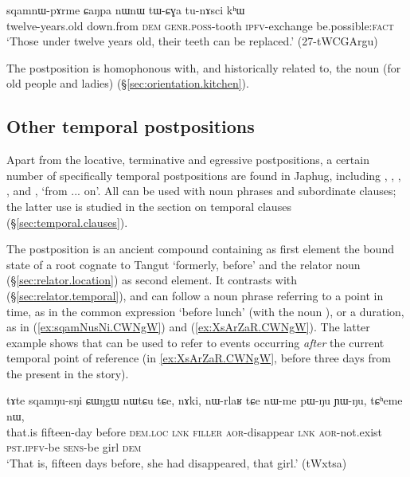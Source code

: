  \begin{exe}
\ex \label{ex:sqamnW.pArme.CaNpa}
 \gll sqamnɯ-pɤrme ɕaŋpa nɯnɯ tɯ-ɕɣa tu-nɤsci kʰɯ \\
 twelve-years.old down.from \textsc{dem} \textsc{genr}.\textsc{poss}-tooth \textsc{ipfv}-exchange be.possible:\textsc{fact} \\
 \glt `Those under twelve years old, their teeth can be replaced.' (27-tWCGArgu) 
\end{exe}

The postposition  is homophonous with, and historically related to, the noun  (for old people and ladies) (§\ref{sec:orientation.kitchen}).

\subsection{Other temporal postpositions} \label{sec:temporal.postpositions}
Apart from the locative, terminative and egressive postpositions, a certain number of specifically temporal postpositions are found in Japhug, including ,  , , ,  and , `from ... on'. All can be used with noun phrases and subordinate clauses; the latter use is studied in the section on temporal clauses (§\ref{sec:temporal.clauses}).

The postposition   is an ancient compound containing as first element the bound state of a root cognate to Tangut  `formerly, before' and the relator noun  (§\ref{sec:relator.location}) as second element. It contrasts with   (§\ref{sec:relator.temporal}), and can follow a noun phrase referring to a point in time, as in the common expression  `before lunch' (with the noun  ), or a duration, as in (\ref{ex:sqamNusNi.CWNgW}) and (\ref{ex:XsArZaR.CWNgW}). The latter example shows that  can be used to refer to events occurring \textit{after} the current temporal point of reference (in \ref{ex:XsArZaR.CWNgW}, before three days from the present in the story).

\begin{exe}
\ex \label{ex:sqamNusNi.CWNgW}
 \gll tɤte sqamŋu-sŋi ɕɯŋgɯ nɯtɕu tɕe, nɤki, nɯ-rlaʁ tɕe nɯ-me pɯ-ŋu ɲɯ-ŋu, tɕʰeme nɯ, \\
 that.is fifteen-day before \textsc{dem}.\textsc{loc} \textsc{lnk} \textsc{filler} \textsc{aor}-disappear \textsc{lnk} \textsc{aor}-not.exist \textsc{pst}.\textsc{ipfv}-be \textsc{sens}-be girl \textsc{dem} \\
 \glt `That is, fifteen days before, she had disappeared, that girl.' (tWxtsa)
\end{exe}


